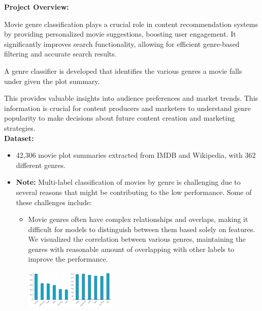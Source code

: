 \documentclass[hbrs-poster.tex]{subfiles}
\begin{document}
    {

        \textbf{Project Overview:}

        Movie genre classification plays a crucial role in content recommendation systems by providing personalized movie suggestions, boosting user engagement. It significantly improves search functionality, allowing for efficient genre-based filtering and accurate search results. 

        A genre classifier is developed that identifies the various genres a movie falls under given the plot summary.

        This provides valuable insights into audience preferences and market trends. This information is crucial for content producers and marketers to understand genre popularity to make decisions about future content creation and marketing strategies.\\
        \textbf{Dataset:}
        \begin{itemize}
            \item 42,306 movie plot summaries extracted from IMDB and Wikipedia, with 362 different genres. 
            \item \textbf{Note:} Multi-label classification of movies by genre is challenging due to several reasons that might be contributing to the low performance. Some of these challenges include:
            \begin{itemize}
                \item Movie genres often have complex relationships and overlaps, making it difficult for models to distinguish between them based solely on features. We visualized the correlation between various genres, maintaining the genres with reasonable amount of overlapping with other labels to improve the performance.
                \begin{tikzfigure}
                    \includegraphics[width=0.18\textwidth, height=0.10\textheight]{figures/output2.png}\includegraphics[width=0.18\textwidth, height=0.10\textheight]{figures/output3.png}

\end{tikzfigure}
\end{itemize}
\end{itemize}}
\end{document}
